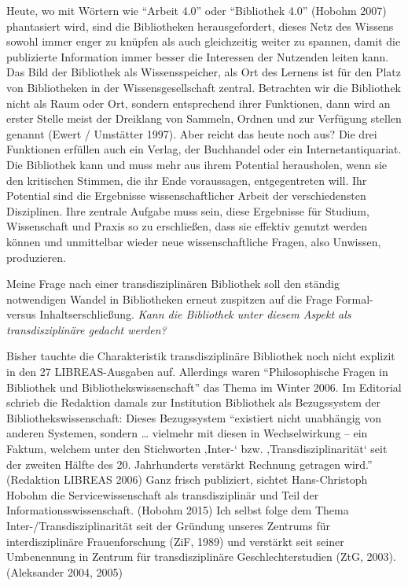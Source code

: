 Heute, wo mit Wörtern wie \enquote{Arbeit 4.0} oder \enquote{Bibliothek
4.0} (Hobohm 2007) phantasiert wird, sind die Bibliotheken
herausgefordert, dieses Netz des Wissens sowohl immer enger zu knüpfen
als auch gleichzeitig weiter zu spannen, damit die publizierte
Information immer besser die Interessen der Nutzenden leiten kann. Das
Bild der Bibliothek als Wissensspeicher, als Ort des Lernens ist für den
Platz von Bibliotheken in der Wissensgesellschaft zentral. Betrachten
wir die Bibliothek nicht als Raum oder Ort, sondern entsprechend ihrer
Funktionen, dann wird an erster Stelle meist der Dreiklang von Sammeln,
Ordnen und zur Verfügung stellen genannt (Ewert / Umstätter 1997). Aber
reicht das heute noch aus? Die drei Funktionen erfüllen auch ein Verlag,
der Buchhandel oder ein Internetantiquariat. Die Bibliothek kann und
muss mehr aus ihrem Potential herausholen, wenn sie den kritischen
Stimmen, die ihr Ende voraussagen, entgegentreten will. Ihr Potential
sind die Ergebnisse wissenschaftlicher Arbeit der verschiedensten
Disziplinen. Ihre zentrale Aufgabe muss sein, diese Ergebnisse für
Studium, Wissenschaft und Praxis so zu erschließen, dass sie effektiv
genutzt werden können und unmittelbar wieder neue wissenschaftliche
Fragen, also Unwissen, produzieren.

Meine Frage nach einer transdisziplinären Bibliothek soll den ständig
notwendigen Wandel in Bibliotheken erneut zuspitzen auf die Frage
Formal- versus Inhaltserschließung. \emph{Kann die Bibliothek unter
diesem Aspekt als transdisziplinäre gedacht werden?}

Bisher tauchte die Charakteristik transdisziplinäre Bibliothek noch
nicht explizit in den 27 LIBREAS-Ausgaben auf. Allerdings waren
\enquote{Philosophische Fragen in Bibliothek und
Bibliothekswissenschaft} das Thema im Winter 2006. Im Editorial schrieb
die Redaktion damals zur Institution Bibliothek als Bezugssystem der
Bibliothekswissenschaft: Dieses Bezugssystem \enquote{existiert nicht
unabhängig von anderen Systemen, sondern \ldots{} vielmehr mit diesen in
Wechselwirkung -- ein Faktum, welchem unter den Stichworten ‚Inter-`
bzw. ‚Transdisziplinarität` seit der zweiten Hälfte des 20. Jahrhunderts
verstärkt Rechnung getragen wird.} (Redaktion LIBREAS 2006) Ganz frisch
publiziert, sichtet Hans-Christoph Hobohm die Servicewissenschaft als
transdisziplinär und Teil der Informationsswissenschaft. (Hobohm 2015)
Ich selbst folge dem Thema Inter-/Transdisziplinarität seit der Gründung
unseres Zentrums für interdisziplinäre Frauenforschung (ZiF, 1989) und
verstärkt seit seiner Umbenennung in Zentrum für transdisziplinäre
Geschlechterstudien (ZtG, 2003). (Aleksander 2004, 2005)

